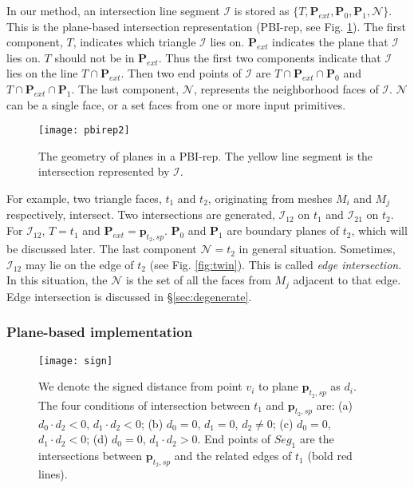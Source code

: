 In our method, an intersection line segment  $\bm{\mathcal{I}}$ is stored as $\{T, \bm{P}_{ext}, \bm{P}_0, \bm{P}_1, \mathcal{N}\}$. This is the plane-based intersection representation (PBI-rep,  see Fig. \ref{fig:pbi}). The first component, $T$, indicates which triangle $\bm{\mathcal{I}}$ lies on.
$\bm{P}_{ext}$ indicates the plane that $\bm{\mathcal{I}}$ lies on. $T$ should not be in $\bm{P}_{ext}$. Thus the first two components indicate that  $\bm{\mathcal{I}}$ lies on the line $T \cap \bm{P}_{ext}$.
Then two end points of $\bm{\mathcal{I}}$ are $T \cap \bm{P}_{ext}\cap\bm{P}_0$ and $T \cap \bm{P}_{ext}\cap\bm{P}_1$.
The last component, $\mathcal{N}$, represents the neighborhood faces of $\bm{\mathcal{I}}$. $\mathcal{N}$ can be a single face, or a set faces from one or more input primitives.

\begin{figure}[t]
\centering
\texttt{[image: pbirep2]}
\caption{The geometry of planes in a PBI-rep. The yellow line segment is the intersection represented by $\bm{\mathcal{I}}$.}
\label{fig:pbi}
\end{figure}

For example, two triangle faces, $t_1$ and $t_2$, originating from meshes $M_i$ and $M_j$ respectively, intersect. Two intersections are generated, ${\bm{\mathcal{I}}}_{12}$ on $t_1$ and ${\bm{\mathcal{I}}}_{21}$ on $t_2$.
For ${\bm{\mathcal{I}}}_{12}$, $T = t_1$ and $\bm{P}_{ext}=\bm{p}_{t_2, sp}$. $\bm{P}_0$ and $\bm{P}_1$ are boundary planes of $t_2$, which will be discussed later.
The last component $\mathcal{N}=t_2$ in general situation. Sometimes, ${\bm{\mathcal{I}}}_{12}$ may lie on the edge of $t_2$ (see Fig. \ref{fig:twin}). This is called \emph{edge intersection}. In this situation, the $\mathcal{N}$ is the set of all the faces from $M_j$ adjacent to that edge. Edge intersection is discussed in \S\ref{sec:degenerate}.


\subsubsection{Plane-based implementation}

\label{sec:embed}
\begin{figure}[t]
\centering
\texttt{[image: sign]}
\caption{We denote the signed distance from point $v_i$ to plane $\bm{p}_{t_2, sp}$ as $d_i$. The four conditions of intersection between $t_1$ and $\bm{p}_{t_2, sp}$ are:
(a) $d_0\cdot d_2<0$, $d_1\cdot d_2<0$;
(b) $d_0=0$, $d_1=0$, $d_2\neq 0$;
(c) $d_0=0$, $d_1\cdot d_2<0$;
(d) $d_0=0$, $d_1\cdot d_2>0$. End points of $Seg_1$ are the intersections between $\bm{p}_{t_2, sp}$ and the related edges of $t_1$ (bold red lines).}
\label{fig:isect}
\end{figure}


